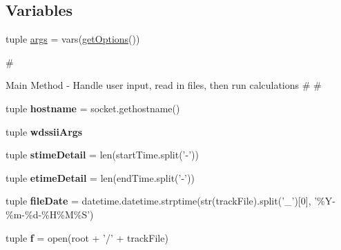 \subsection*{Variables}
\begin{DoxyCompactItemize}
\item 
\hypertarget{namespacebest__track_a67f9d5349c90a840d4a09022531743c3}{tuple \hyperlink{namespacebest__track_a67f9d5349c90a840d4a09022531743c3}{args} = vars(\hyperlink{namespacebest__track_a09088a9013df27853bf9f485f05f0a72}{get\-Options}())}\label{namespacebest__track_a67f9d5349c90a840d4a09022531743c3}

\begin{DoxyCompactList}\small\item\em \begin{DoxyVerb}                                                                                                              #
\end{DoxyVerb}
 Main Method -\/ Handle user input, read in files, then run calculations \# \# \end{DoxyCompactList}\item 
\hypertarget{namespacebest__track_aacc2d16ab53ea982e37e72bc68ee00ac}{tuple {\bfseries hostname} = socket.\-gethostname()}\label{namespacebest__track_aacc2d16ab53ea982e37e72bc68ee00ac}

\item 
tuple {\bfseries wdssii\-Args}
\item 
\hypertarget{namespacebest__track_a7c8bc59cb59e6f944e182ae4f1c1ac5c}{tuple {\bfseries stime\-Detail} = len(start\-Time.\-split('-\/'))}\label{namespacebest__track_a7c8bc59cb59e6f944e182ae4f1c1ac5c}

\item 
\hypertarget{namespacebest__track_ab451bc85fb0a37d935bc56db27a15342}{tuple {\bfseries etime\-Detail} = len(end\-Time.\-split('-\/'))}\label{namespacebest__track_ab451bc85fb0a37d935bc56db27a15342}

\item 
\hypertarget{namespacebest__track_a0399d7a7d1d66053450db567e629c014}{tuple {\bfseries file\-Date} = datetime.\-datetime.\-strptime(str(track\-File).split('\-\_\-')\mbox{[}0\mbox{]}, '\%Y-\/\%m-\/\%d-\/\%H\%M\%S')}\label{namespacebest__track_a0399d7a7d1d66053450db567e629c014}

\item 
\hypertarget{namespacebest__track_a416c0a25339cc0f15fd8eaf13d1375fd}{tuple {\bfseries f} = open(root + '/' + track\-File)}\label{namespacebest__track_a416c0a25339cc0f15fd8eaf13d1375fd}


\end{DoxyCompactItemize}
